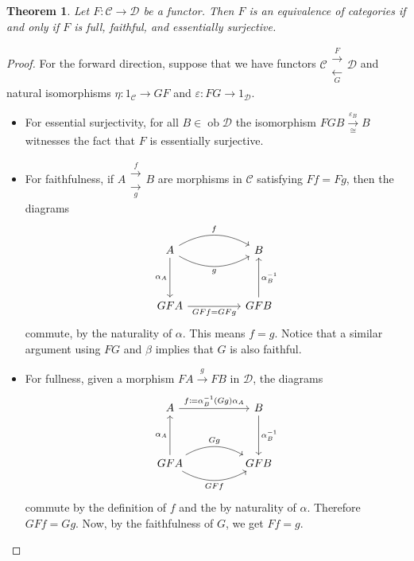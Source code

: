 \documentclass[a4paper,11pt]{article}
\theoremstyle{break_italics}
\newtheorem*{theorem*}{Theorem}
\theoremstyle{break_upright}
\theoremstyle{remark}
\newcommand{\ob}{\operatorname{ob}}
\newcommand{\C}{\mathcal{C}}
\newcommand{\D}{\mathcal{D}}
\begin{document}
\begin{theorem*}
	Let $F \colon \C \to \D$ be a functor. Then $F$ is an equivalence of categories if and only if $F$ is full, faithful, and essentially surjective.
\end{theorem*}
\begin{proof}
For the forward direction, suppose that we have functors $\C \substack{\xrightarrow{F} \\ \xleftarrow[G]{}} \D$ and natural isomorphisms $\eta \colon 1_\C \to GF$ and $\varepsilon \colon FG \to 1_\D$.
\begin{itemize}
	\item For essential surjectivity, for all $B \in \ob\D$ the isomorphism $FGB \xrightarrow[\cong]{\varepsilon_B}B$ witnesses the fact that $F$ is essentially surjective.
	\item For faithfulness, if $A \substack{\xrightarrow{f} \\ \xrightarrow[g]{}} B$ are morphisms in $\C$ satisfying $Ff = Fg$, then the diagrams
		\[
\begin{tikzcd}
A \arrow[rr, "f", bend left] \arrow[rr, "g"', bend right] \arrow[dd, "\alpha_A"'] &  & B                                \\
                                                                                  &  &                                  \\
GFA \arrow[rr, "GFf = GFg"']                                                      &  & GFB \arrow[uu, "\alpha_B^{-1}"']
\end{tikzcd}
		\]
		commute, by the naturality of $\alpha$. This means $f = g$. Notice that a similar argument using $FG$ and $\beta$ implies that $G$ is also faithful.
		\item For fullness, given a morphism $FA \xrightarrow{g} FB$ in $\D$, the diagrams
		\[
\begin{tikzcd}
A \arrow[rr, "f \coloneqq \alpha_B^{-1} (Gg)\alpha_A"]                                &  & B \arrow[dd, "\alpha_B^{-1}"] \\
                                                                                      &  &                               \\
GFA \arrow[uu, "\alpha_A"] \arrow[rr, "Gg", bend left] \arrow[rr, "GFf"', bend right] &  & GFB                          
\end{tikzcd}
		\]
		commute by the definition of $f$ and the by naturality of $\alpha$. Therefore $GFf = Gg$. Now, by the faithfulness of $G$, we get $Ff = g$.
\end{itemize}


\end{proof}
\end{document}
